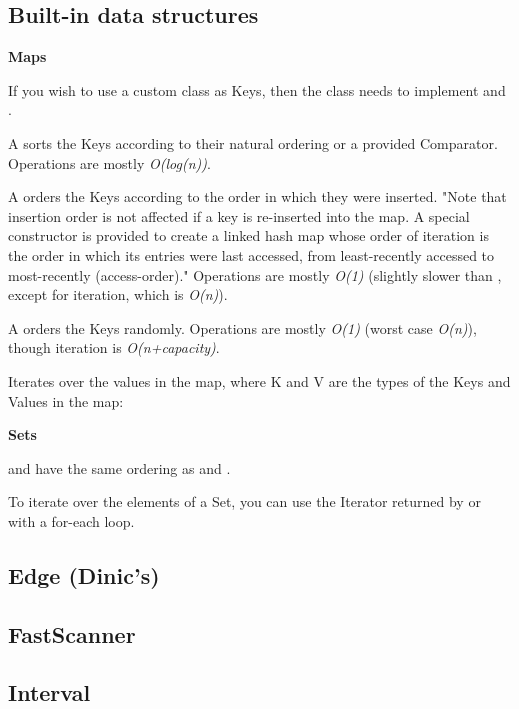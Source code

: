 
\subsection*{Built-in data structures}

\textbf{Maps}

If you wish to use a custom class as Keys, then the class needs to implement  and .

A  sorts the Keys according to their natural ordering or a provided Comparator. Operations are mostly \textit{O(log(n))}.

A  orders the Keys according to the order in which they were inserted. "Note that insertion order is not affected if a key is re-inserted into the map. A special constructor is provided to create a linked hash map whose order of iteration is the order in which its entries were last accessed, from least-recently accessed to most-recently (access-order)." Operations are mostly \textit{O(1)} (slightly slower than , except for iteration, which is \textit{O(n)}).

A  orders the Keys randomly. Operations are mostly \textit{O(1)} (worst case \textit{O(n)}), though iteration is \textit{O(n+capacity)}.

Iterates over the values in the map, where K and V are the types of the Keys and Values in the map:



\textbf{Sets}

 and  have the same ordering as  and .

To iterate over the elements of a Set, you can use the Iterator returned by  or with a for-each loop.

\subsection*{Edge (Dinic's)}



\subsection*{FastScanner}



\subsection*{Interval}




%

\newpage